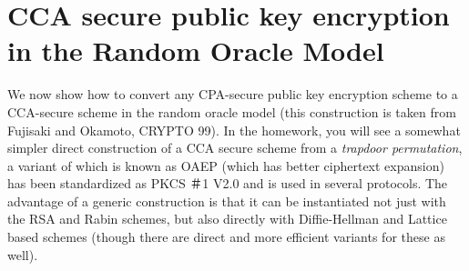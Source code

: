 \section{CCA secure public key encryption in the Random Oracle
Model}\label{12-CCA-secure-public-key-}

We now show how to convert any CPA-secure public key encryption scheme
to a CCA-secure scheme in the random oracle model (this construction is
taken from Fujisaki and Okamoto, CRYPTO 99). In the homework, you will
see a somewhat simpler direct construction of a CCA secure scheme from a
\emph{trapdoor permutation}, a variant of which is known as OAEP (which
has better ciphertext expansion) has been standardized as PKCS ＃1 V2.0
and is used in several protocols. The advantage of a generic
construction is that it can be instantiated not just with the RSA and
Rabin schemes, but also directly with Diffie-Hellman and Lattice based
schemes (though there are direct and more efficient variants for these
as well).

